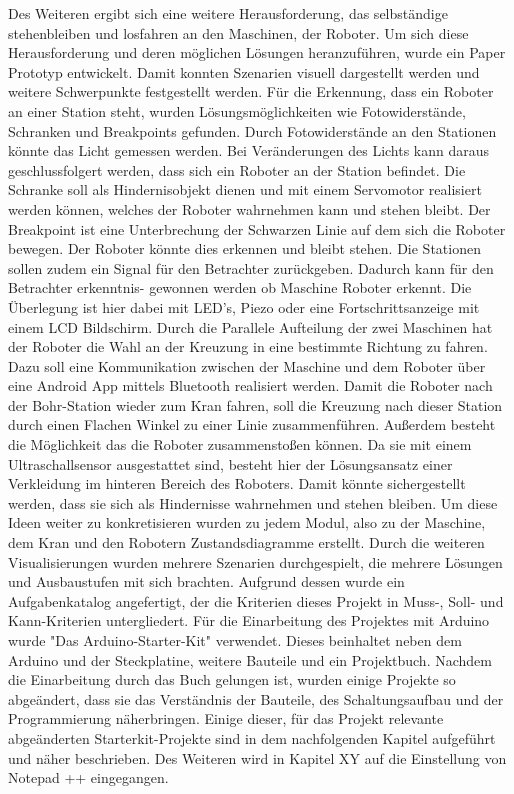 Des Weiteren ergibt sich eine weitere Herausforderung, das selbständige stehenbleiben und losfahren an den Maschinen, der Roboter. Um sich diese Herausforderung und deren möglichen Lösungen heranzuführen, wurde ein Paper Prototyp entwickelt. Damit konnten Szenarien visuell dargestellt werden und weitere Schwerpunkte festgestellt werden. Für die Erkennung, dass ein Roboter an einer Station steht, wurden Lösungsmöglichkeiten wie Fotowiderstände, Schranken und Breakpoints gefunden. Durch Fotowiderstände an den Stationen könnte das Licht gemessen werden. Bei Veränderungen des Lichts kann daraus geschlussfolgert werden, dass sich ein Roboter an der Station befindet. Die Schranke soll als Hindernisobjekt dienen und mit einem Servomotor realisiert werden können, welches der Roboter wahrnehmen kann und stehen bleibt. Der Breakpoint ist eine Unterbrechung der Schwarzen Linie auf dem sich die Roboter bewegen. Der Roboter könnte dies erkennen und bleibt stehen. Die Stationen sollen zudem ein Signal für den Betrachter zurückgeben. Dadurch kann für den Betrachter erkenntnis- gewonnen werden ob Maschine Roboter erkennt. Die Überlegung ist hier dabei mit LED’s, Piezo oder eine Fortschrittsanzeige mit einem LCD Bildschirm.
Durch die Parallele Aufteilung der zwei Maschinen hat der Roboter die Wahl an der Kreuzung in eine bestimmte Richtung zu fahren. Dazu soll eine Kommunikation zwischen der Maschine und dem Roboter über eine Android App mittels Bluetooth realisiert werden. Damit die Roboter nach der Bohr-Station wieder zum Kran fahren, soll die Kreuzung nach dieser Station durch einen Flachen Winkel zu einer Linie zusammenführen. Außerdem besteht die Möglichkeit das die Roboter zusammenstoßen können. Da sie mit einem Ultraschallsensor ausgestattet sind, besteht hier der Lösungsansatz einer Verkleidung im hinteren Bereich des Roboters. Damit könnte sichergestellt werden, dass sie sich als Hindernisse wahrnehmen und stehen bleiben.
Um diese Ideen weiter zu konkretisieren wurden zu jedem Modul, also zu der Maschine, dem Kran und den Robotern Zustandsdiagramme erstellt.
Durch die weiteren Visualisierungen wurden mehrere Szenarien durchgespielt, die mehrere Lösungen und Ausbaustufen mit sich brachten. Aufgrund dessen wurde ein Aufgabenkatalog angefertigt, der die Kriterien dieses Projekt in Muss-, Soll- und Kann-Kriterien untergliedert.
Für die Einarbeitung des Projektes mit Arduino wurde "Das Arduino-Starter-Kit" verwendet. Dieses beinhaltet neben dem Arduino und der Steckplatine, weitere Bauteile und ein Projektbuch. Nachdem die Einarbeitung durch das Buch gelungen ist, wurden einige Projekte so abgeändert, dass sie das Verständnis der Bauteile, des Schaltungsaufbau und der Programmierung näherbringen. Einige dieser, für das Projekt relevante abgeänderten Starterkit-Projekte sind in dem nachfolgenden Kapitel aufgeführt und näher beschrieben. Des Weiteren wird in Kapitel XY auf die Einstellung von Notepad ++ eingegangen.



